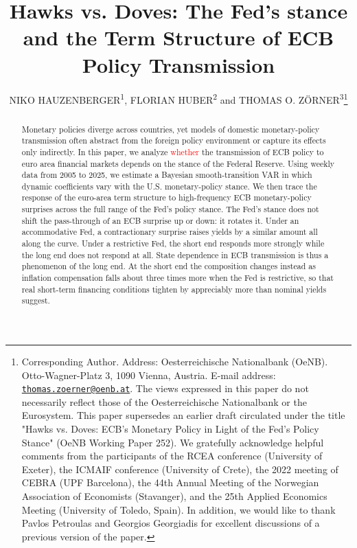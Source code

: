 \documentclass[11pt,letterpaper,twoside]{article}
\title{\huge{Hawks vs. Doves: The Fed's stance and the Term Structure of ECB Policy Transmission}}
\author{\large{\uppercase{Niko Hauzenberger}\textsuperscript{1}, \uppercase{Florian Huber}\textsuperscript{2} and \uppercase{Thomas O. Zörner}\textsuperscript{3}}\thanks{Corresponding Author. Address: Oesterreichische Nationalbank (OeNB). Otto-Wagner-Platz 3, 1090 Vienna, Austria. E-mail address: \texttt{\href{mailto:thomas.zoerner@oenb.at}{thomas.zoerner@oenb.at}}. The views expressed in this paper do not necessarily reflect those of the Oesterreichische Nationalbank or the Eurosystem. This paper supersedes an earlier draft circulated under the title "Hawks vs. Doves: ECB's Monetary Policy in Light of
the Fed’s Policy Stance" (OeNB Working Paper 252). We gratefully acknowledge helpful comments from the participants of the RCEA conference (University of Exeter), the ICMAIF conference (University of Crete), the 2022 meeting of CEBRA (UPF Barcelona), the 44th Annual Meeting of the Norwegian Association of Economists (Stavanger), and the 25th Applied Economics Meeting (University of Toledo, Spain). In addition, we would like to thank Pavlos Petroulas and Georgios Georgiadis for excellent discussions of a previous version of the paper.}}
\affil{\textsuperscript{1}{University of Strathclyde}\\ %
\textsuperscript{2}{University of Salzburg}\\ %
\textsuperscript{3}{Oesterreichische Nationalbank (OeNB)}
}
\date{}
\newcommand{\rev}[1]{\textcolor{red}{#1}}
\begin{document}
\maketitle

\begin{abstract} 
\noindent 
Monetary policies diverge across countries, yet models of domestic monetary-policy transmission often abstract from the foreign policy environment or capture its effects only indirectly. In this paper, we analyze \rev{whether} the transmission of ECB policy to euro area financial markets depends on the stance of the Federal Reserve. Using weekly data from 2005 to 2025, we estimate a Bayesian smooth-transition VAR in which dynamic coefficients vary with the U.S. monetary-policy stance. We then trace the response of the euro-area term structure to high-frequency ECB monetary-policy surprises across the full range of the Fed's policy stance. The Fed's stance does not shift the pass-through of an ECB surprise up or down: it rotates it. Under an accommodative Fed, a contractionary surprise raises yields by a similar amount all along the curve. Under a restrictive Fed, the short end responds more strongly while the long end does not respond at all. State dependence in ECB transmission is thus a phenomenon of the long end. At the short end the composition changes instead as inflation compensation falls about three times more when the Fed is restrictive, so that real short-term financing conditions tighten by appreciably more than nominal yields suggest. %
\end{abstract}

\begin{keywords} \end{keywords}

\begin{codes} \end{codes}



\clearpage




\onehalfspacing
\renewcommand{\thepage}{\arabic{page}}







\end{document}
